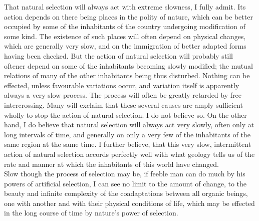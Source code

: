 \indent That natural selection will always act with extreme slowness, I fully admit. Its action depends on there being places in the polity of nature, which can be better occupied by some of the inhabitants of the country undergoing modification of some kind. The existence of such places will often depend on physical changes, which are generally very slow, and on the immigration of better adapted forms having been checked. But the action of natural selection will probably still oftener depend on some of the inhabitants becoming slowly modified; the mutual relations of many of the other inhabitants being thus disturbed. Nothing can be effected, unless favourable variations occur, and variation itself is apparently always a very slow process. The process will often be greatly retarded by free intercrossing. Many will exclaim that these several causes are amply sufficient wholly to stop the action of natural selection. I do not believe so. On the other hand, I do believe that natural selection will always act very slowly, often only at long intervals of time, and generally on only a very few of the inhabitants of the same region at the same time. I further believe, that this very slow, intermittent action of natural selection accords perfectly well with what geology tells us of the rate and manner at which the inhabitants of this world have changed. \\
\indent Slow though the process of selection may be, if feeble man can do much by his powers of artificial selection, I can see no limit to the amount of change, to the beauty and infinite complexity of the coadaptations between all organic beings, one with another and with their physical conditions of life, which may be effected in the long course of time by nature's power of selection. \\

